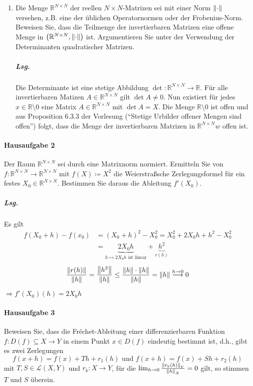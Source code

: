 \documentclass{scrreprt}
\begin{document}
\begin{enumerate}[1)]
\item Die Menge $\mathbb{R}^{N \times N}$ der reellen $N \times N$-Matrizen sei
  mit einer Norm $\norm{\cdot}$ versehen, z.B. eine der üblichen Operatornormen
  oder der Frobenius-Norm.
  Beweisen Sie, dass die Teilmenge der invertierbaren Matrizen eine offene Menge
  in $\qty(\mathbb{R}^{N \times N}, \norm{\cdot})$ ist.
  Argumentieren Sie unter der Verwendung der Determinanten quadratischer
  Matrizen.

  \subparagraph{Lsg.} Die Determinante ist eine stetige Abbildung
  $\det \colon \mathbb{R}^{N \times N} \to \mathbb{R}$.
  Für alle invertierbaren Matizen $A \in \mathbb{R}^{N \times N}$
  gilt $\det A \ne 0$.
  Nun existiert für jedes $x \in \mathbb{R} \setminus \qty{0}$
  eine Matrix $A \in \mathbb{R}^{N \times N}$ mit
  $\det A = X$.
  Die Menge $\mathbb{R} \setminus \qty{0}$ ist offen und aus
  Proposition 6.3.3 der Vorlesung
  (``Stetige Urbilder offener Mengen sind offen'')
  folgt, dass die Menge der invertierbaren Matrizen in
  $\mathbb{R}^{N \times N}w$ offen ist.
\end{enumerate}

\paragraph{Hausaufgabe 2} Der Raum $\mathbb{R}^{N \times N}$ sei durch eine
Matrixnorm normiert.
Ermitteln Sie von $f \colon \mathbb{R}^{N \times N} \to \mathbb{R}^{N \times N}$
mit $f(X) \coloneqq X^2$ die Weierstraßsche Zerlegungsformel für ein festes
$X_0 \in \mathbb{R}^{N \times N}$.
Bestimmen Sie daraus die Ableitung $f'(X_0)$.

\subparagraph{Lsg.}

Es gilt
\begin{align*}
  f(X_0 + h) - f(x_0) &= (X_0 + h)^2 - X_0^2 = X_0^2 + 2X_0h + h^2 - X_0^2 \\
                      &= \underset{h \mapsto 2X_0h \text{ ist linear}}{\underbrace{2X_0h}} +
                        \underset{r(h)}{\underbrace{h^2}}
\end{align*}
\[
  \frac{\norm{r(h)}}{\norm{h}} = \frac{\norm{h^2}}{\norm{h}}
  \leq \frac{\norm{h} \cdot \norm{h}}{\norm{h}} = \norm{h}
  \overset{h \to 0}\longrightarrow 0
\]

$\Rightarrow f'(X_0)(h) = 2X_0h$


\paragraph{Hausaufgabe 3} Beweisen Sie, dass die Fréchet-Ableitung einer
differenzierbaren Funktion $f \colon D(f) \subseteq X \to Y$
in einem Punkt $x \in D(f)$ eindeutig bestimmt ist, d.h., gibt es zwei
Zerlegungen
\[
  f(x + h) = f(x) + Th + r_1(h) \text{ und } f(x + h) = f(x) + Sh + r_2(h)
\]
mit $T, S \in \mathcal{L}(X, Y)$ und $r_k \colon X \to Y$, für die
$\lim_{h \to 0} \frac{\norm{r_k(h)}_Y}{\norm{h}_X} = 0$ gilt, so stimmen
$T$ und $S$ überein.
\end{document}
